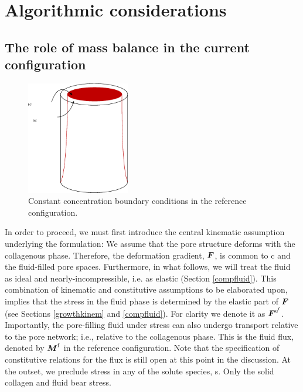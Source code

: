 \section{Algorithmic considerations}
\label{algorithmic-considerations}


\subsection{The role of mass balance in the current
  configuration}
\label{role-of-current-mass-balance} 

\begin{figure}[ht]
  \centering
  \includegraphics[width=0.4\textwidth]
                  {images/elucidation/reference-boundary-conditions}
  \caption{Constant concentration boundary conditions in the reference
    configuration.} 
  \label{erroneous-bc}
\end{figure}

In order to proceed, we must first introduce the central kinematic
assumption underlying the 
formulation: We assume that the pore structure deforms with the
collagenous phase. Therefore, the deformation gradient, $\mbox{\boldmath$ F$}$, is
common to c and the fluid-filled pore spaces. Furthermore, in what
follows, we will treat the fluid as ideal and nearly-incompressible,
i.e. as elastic (Section \ref{compfluid}). This combination of
kinematic and constitutive assumptions to be elaborated upon, implies
that the stress in the fluid phase is determined by the elastic part of
$\mbox{\boldmath$ F$}$ (see Sections \ref{growthkinem} and
\ref{compfluid}). For clarity we denote it as
$\mbox{\boldmath$ F$}^{\mathrm{e}^\mathrm{f}}$. Importantly, the pore-filling fluid under stress
can also undergo transport relative to the pore network; i.e.,
relative to the collagenous phase. This is the fluid flux, denoted by
$\mbox{\boldmath$ M$}^\mathrm{f}$ in the reference configuration. Note that the
specification of constitutive relations for the flux is still open at
this point in the discussion. At the outset, we preclude stress in any
of the solute species, s. Only the solid collagen and fluid bear
stress. 

